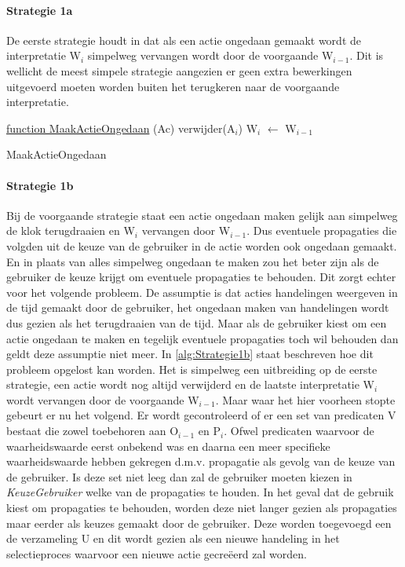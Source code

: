 \paragraph{Strategie 1a}
De eerste strategie houdt in dat als een actie ongedaan gemaakt wordt de interpretatie W$_{i}$ simpelweg vervangen wordt door de voorgaande W$_{i-1}$. Dit is wellicht de meest simpele strategie aangezien er geen extra bewerkingen uitgevoerd moeten worden buiten het terugkeren naar de voorgaande interpretatie.

\begin{algorithm}
	\underline{function MaakActieOngedaan} (Ac)\;
	\Output{}
	verwijder(A$_{i}$)\;
	W$_{i}$ $\leftarrow$ W$_{i-1}$\;
	\caption{MaakActieOngedaan\label{alg:Strategie1a}}
\end{algorithm}

\paragraph{Strategie 1b}
Bij de voorgaande strategie staat een actie ongedaan maken gelijk aan simpelweg de klok terugdraaien en W$_{i}$ vervangen door W$_{i-1}$. Dus eventuele propagaties die volgden uit de keuze van de gebruiker in de actie worden ook ongedaan gemaakt. En in plaats van alles simpelweg ongedaan te maken zou het beter zijn als de gebruiker de keuze krijgt om eventuele propagaties te behouden. Dit zorgt echter voor het volgende probleem. De assumptie is dat acties handelingen weergeven in de tijd gemaakt door de gebruiker, het ongedaan maken van handelingen wordt dus gezien als het terugdraaien van de tijd. Maar als de gebruiker kiest om een actie ongedaan te maken en tegelijk eventuele propagaties toch wil behouden dan geldt deze assumptie niet meer. In \ref{alg:Strategie1b} staat beschreven hoe dit probleem opgelost kan worden. Het is simpelweg een uitbreiding op de eerste strategie, een actie wordt nog altijd verwijderd en de laatste interpretatie W$_{i}$ wordt vervangen door de voorgaande W$_{i-1}$. Maar waar het hier voorheen stopte gebeurt er nu het volgend. Er wordt gecontroleerd of er een set van predicaten V bestaat die zowel toebehoren aan O$_{i-1}$ en P$_{i}$. Ofwel predicaten waarvoor de waarheidswaarde eerst onbekend was en daarna een meer specifieke waarheidswaarde hebben gekregen d.m.v. propagatie als gevolg van de keuze van de gebruiker. Is deze set niet leeg dan zal de gebruiker moeten kiezen in \emph{KeuzeGebruiker} welke van de propagaties te houden. In het geval dat de gebruik kiest om propagaties te behouden, worden deze niet langer gezien als propagaties maar eerder als keuzes gemaakt door de gebruiker. Deze worden toegevoegd een de verzameling U en dit wordt gezien als een nieuwe handeling in het selectieproces waarvoor een nieuwe actie gecre\"{e}erd zal worden.

